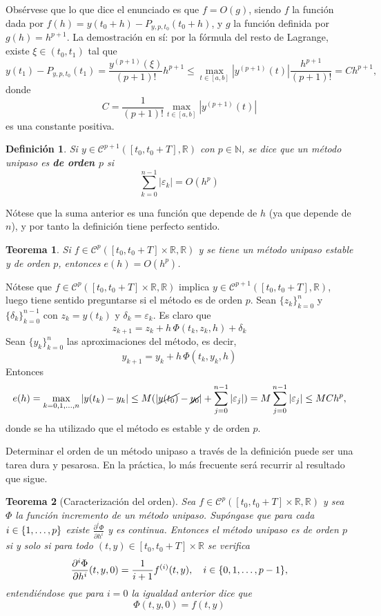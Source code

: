 \documentclass[11pt]{report}
\makeatletter
\renewenvironment{proof}[1][\proofname]{\par
  \pushQED{\qed}%
  \normalfont \topsep\z@skip %
  \trivlist
  \item[\hskip\labelsep
        \itshape
    #1\@addpunct{.}]\ignorespaces
}{%
  \popQED\endtrivlist\@endpefalse
}
\theoremstyle{mytheorem}
\newtheorem{theorem}{Teorema}
\theoremstyle{mydefinition}
\newtheorem{definition}{Definición}
\theoremstyle{myexample}
\let\oldproofname=\proofname
\renewcommand{\proofname}{\rm\bf{\oldproofname}}}
\newenvironment{cdefinition} %
  {\begin{mdframed}[
        linewidth=3pt,
        linecolor=c1,
        bottomline=false,
        topline=false,
        rightline=false,
        innerrightmargin=0pt,
        innertopmargin=0pt,
        innerbottommargin=0pt,
        innerleftmargin=1em, %
        skipabove=\baselineskip]
    \begin{definition}}
  {\end{definition}\end{mdframed}}
\newenvironment{ctheorem} %
  {\begin{mdframed}[
        linewidth=3pt,
        linecolor=c2,
        bottomline=false,
        topline=false,
        rightline=false,
        innerrightmargin=0pt,
        innertopmargin=0pt,
        innerbottommargin=0pt,
        innerleftmargin=1em, %
        skipabove=\baselineskip]
    \begin{theorem}}
  {\end{theorem}\end{mdframed}}
\newcommand{\R}{\mathbb R}
\newcommand{\N}{\mathbb N}
\newcommand{\mybf}[1]{\boldmath\textbf{\color{c1}#1}\unboldmath}
\makeatother
\begin{document}
\begin{proof}
Obsérvese que lo que dice el enunciado es que $f = O(g)$, siendo $f$ la función dada por $f(h) = y(t_0+h)-P_{y,p,t_0}(t_0+h)$, y $g$ la función definida por $g(h) = h^{p+1}$. La demostración en sí: por la fórmula del resto de Lagrange, existe $\xi \in (t_0,t_1)$ tal que
\[y(t_1) - P_{y,p,t_0}(t_1) = \frac{y^{(p+1)}(\xi)}{(p+1)!}h^{p+1} \leq \max_{t \in [a,b]} |y^{(p+1)}(t)|\frac{h^{p+1}}{(p+1)!} = Ch^{p+1},\]
donde
\[C=\frac{1}{(p+1)!}\max_{t \in [a,b]} |y^{(p+1)}(t)|\]
es una constante positiva.
\end{proof}

\begin{cdefinition}
Si $y \in \mathcal{C}^{p+1}([t_0,t_0+T], \R)$ con $p \in \N$, se dice que un método unipaso es \mybf{de orden $p$} si
\[\sum_{k=0}^{n-1} |\varepsilon_k| = O(h^p)\]
\end{cdefinition}

Nótese que la suma anterior es una función que depende de $h$ (ya que depende de $n$), y por tanto la definición tiene perfecto sentido.

\begin{ctheorem}
\label{teo7}
Si $f \in \mathcal{C}^p([t_0,t_0+T] \times \R, \R)$ y se tiene un método unipaso estable y de orden $p$, entonces $e(h) = O(h^p)$.
\end{ctheorem}

\begin{proof}
Nótese que  $f \in \mathcal{C}^p([t_0,t_0+T] \times \R, \R)$ implica $y \in \mathcal{C}^{p+1}([t_0,t_0+T], \R)$, luego tiene sentido preguntarse si el método es de orden $p$. Sean $\{z_k\}_{k=0}^n$ y $\{\delta_k\}_{k=0}^{n-1}$ con $z_k = y(t_k)$ y $\delta_k = \varepsilon_k$. Es claro que
\[z_{k+1} = z_k+h \, \Phi(t_k,z_k,h)+\delta_k\]
Sean $\{y_k\}_{k=0}^n$ las aproximaciones del método, es decir,
\[y_{k+1} = y_k+h \, \Phi(t_k,y_k,h)\]
Entonces
\[e(h) = \max_{k=0,1,\mathellipsis,n}|y(t_k)-y_k| \leq M(|\cancel{y(t_0)}-\cancel{y_0}|+\sum_{j=0}^{n-1}|\varepsilon_j|) =M \sum_{j=0}^{n-1}|\varepsilon_j| \leq MCh^p,\]
donde se ha utilizado que el método es estable y de orden $p$.
\end{proof}

Determinar el orden de un método unipaso a través de la definición puede ser una tarea dura y pesarosa. En la práctica, lo más frecuente será recurrir al resultado que sigue.

\begin{ctheorem}[Caracterización del orden]
\label{teo2.17}
Sea $f \in \mathcal{C}^p([t_0,t_0+T] \times \R,\R)$ y sea $\Phi$ la función incremento de un método unipaso. Supóngase que para cada $i \in \{1,\mathellipsis,p\}$ existe $\frac{\partial^i \Phi}{\partial h^i}$ y es continua. Entonces el método unipaso es de orden $p$ si y solo si para todo $(t,y) \in [t_0,t_0+T] \times \R$ se verifica
\[\frac{\partial^{i}\Phi}{\partial h^{i}}(t,y,0) = \frac{1}{i+1}f^{(i)}(t,y), \quad i \in \{0,1,\mathellipsis,p-1\},\]
entendiéndose que para $i = 0$ la igualdad anterior dice que
\[\Phi(t,y,0) = f(t,y)\]
\end{ctheorem}
\end{document}
